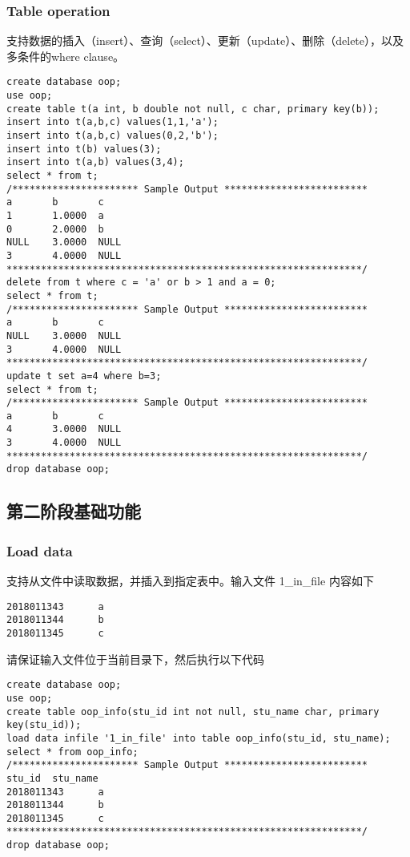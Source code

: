 \documentclass[12pt,a4paper]{article}
\begin{document}
\subsubsection{Table operation}

支持数据的插入（insert）、查询（select）、更新（update）、删除（delete），以及多条件的where clause。

\begin{lstlisting}
create database oop;
use oop;
create table t(a int, b double not null, c char, primary key(b)); 
insert into t(a,b,c) values(1,1,'a'); 
insert into t(a,b,c) values(0,2,'b'); 
insert into t(b) values(3); 
insert into t(a,b) values(3,4); 
select * from t; 
/********************** Sample Output *************************
a       b       c       
1       1.0000  a       
0       2.0000  b       
NULL    3.0000  NULL    
3       4.0000  NULL   
**************************************************************/
delete from t where c = 'a' or b > 1 and a = 0; 
select * from t; 
/********************** Sample Output *************************
a       b       c       
NULL    3.0000  NULL    
3       4.0000  NULL  
**************************************************************/
update t set a=4 where b=3; 
select * from t;
/********************** Sample Output *************************
a       b       c       
4       3.0000  NULL    
3       4.0000  NULL 
**************************************************************/
drop database oop; 
\end{lstlisting}

\subsection{第二阶段基础功能}

\subsubsection{Load data}

支持从文件中读取数据，并插入到指定表中。输入文件 1\_in\_file 内容如下

\begin{lstlisting}
2018011343      a
2018011344      b
2018011345      c
\end{lstlisting}

请保证输入文件位于当前目录下，然后执行以下代码

\begin{lstlisting}
create database oop;
use oop;
create table oop_info(stu_id int not null, stu_name char, primary key(stu_id)); 
load data infile '1_in_file' into table oop_info(stu_id, stu_name);
select * from oop_info; 
/********************** Sample Output *************************
stu_id  stu_name        
2018011343      a       
2018011344      b       
2018011345      c    
**************************************************************/
drop database oop;
\end{lstlisting}
\end{document}
